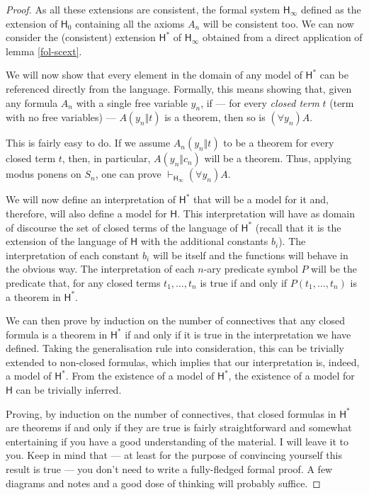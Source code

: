 \begin{proof}
As all these extensions are consistent, the formal system $\mathsf{H}_\infty$ defined as the extension of $\mathsf{H}_0$ containing all the axioms $A_n$ will be consistent too.
We can now consider the (consistent) extension $\mathsf{H}^*$ of $\mathsf{H}_\infty$ obtained from a direct application of lemma \ref{fol-scext}.

We will now show that every element in the domain of any model of $\mathsf{H}^*$ can be referenced directly from the language.
Formally, this means showing that, given any formula $A_n$ with a single free variable $y_n$, if --- for every \emph{closed term} $t$ (term with no free variables) --- $A(y_n\Vert t)$ is a theorem, then so is $(\forall y_n) A$.

This is fairly easy to do. If we assume $A_n(y_n\Vert t)$ to be a theorem for every closed term $t$, then, in particular, $A(y_n\Vert c_n)$ will be a theorem. Thus, applying modus ponens on $S_n$, one can prove $\vdash_{\mathsf{H}_\infty} (\forall y_n) A$.

We will now define an interpretation of $\mathsf{H}^*$ that will be a model for it and, therefore, will also define a model for $\mathsf{H}$. This interpretation will have as domain of discourse the set of closed terms of the language of $\mathsf{H}^*$ (recall that it is the extension of the language of $\mathsf{H}$ with the additional constants $b_i$).
The interpretation of each constant $b_i$ will be itself and the functions will behave in the obvious way.
The interpretation of each $n$-ary predicate symbol $P$ will be the predicate that, for any closed terms $t_1,\ldots,t_n$ is true if and only if $P(t_1,\ldots,t_n)$ is a theorem in $\mathsf{H}^*$. 

We can then prove by induction on the number of connectives that any closed formula is a theorem in $\mathsf{H}^*$ if and only if it is true in the interpretation we have defined.
Taking the generalisation rule into consideration, this can be trivially extended to non-closed formulas, which implies that our interpretation is, indeed, a model of $\mathsf{H}^*$.
From the existence of a model of $\mathsf{H}^*$, the existence of a model for $\mathsf{H}$ can be trivially inferred.

Proving, by induction on the number of connectives, that closed formulas in $\mathsf{H}^*$ are theorems if and only if they are true is fairly straightforward and somewhat entertaining if you have a good understanding of the material. I will leave it to you.
Keep in mind that --- at least for the purpose of convincing yourself this result is true --- you don't need to write a fully-fledged formal proof.
A few diagrams and notes and a good dose of thinking will probably suffice.
\end{proof}
